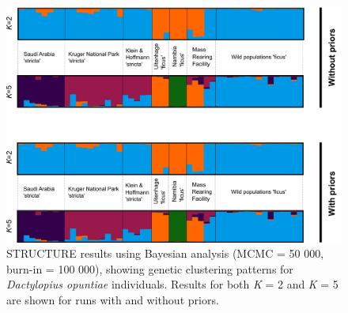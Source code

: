 \vspace{0.5cm}
\begin{figure}[H]
	\centering
	\includegraphics[scale =0.9]{Images/structure_diagrams.pdf}
	\vspace{0.2cm}
	\caption{STRUCTURE results using Bayesian analysis (MCMC = 50 000, burn-in = 100 000), showing genetic clustering patterns for \textit{Dactylopius opuntiae} individuals. Results for both \textit{K} = 2 and \textit{K} = 5 are shown for runs with and without priors.}
	\label{fig:struc}
\end{figure}



